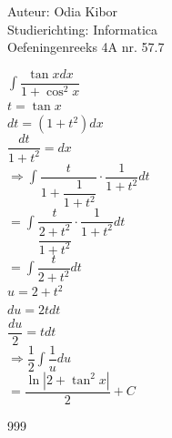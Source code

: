 \documentclass[a4paper]{article}
\begin{document}
  
\noindent \large Auteur: Odia Kibor \\
\noindent \large Studierichting: Informatica\\
\noindent \large Oefeningenreeks 4A nr. 57.7
\\

\medskip

\normalsize


$ \displaystyle\int \dfrac{\tan x dx}{1 + \cos^2 x} $\\

$t = \tan x$\\

$dt = (1 + t^2) dx$\\

$\dfrac{dt}{1 + t^2} = dx$\\

$\Rightarrow \displaystyle\int \dfrac{t}{1 + \dfrac{1}{1 + t^2}} \cdot \dfrac{1}{1 + t^2} dt $\\

$= \displaystyle\int \dfrac{t}{\dfrac{2 + t^2}{1 + t^2}} \cdot \dfrac{1}{1 + t^2} dt $\\

$= \displaystyle\int \dfrac{t}{2 + t^2} dt $\\

$u = 2 + t^2$\\

$du = 2t dt$\\

$\dfrac{du}{2} = t dt$\\

$\Rightarrow  \dfrac{1}{2}\displaystyle\int \dfrac{1}{u} du $\\

$= \dfrac{\ln |2 + \tan^2 x|}{2} + C$\\




















\begin{thebibliography}{999}
\end{thebibliography}
\end{document}
